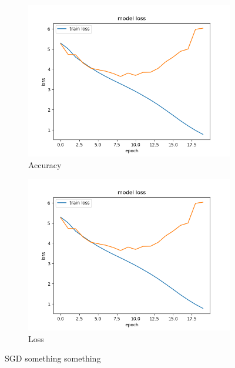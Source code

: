 

\begin{figure}[!h]
\begin{subfigure}{.5\textwidth}
  \centering
  \includegraphics[width=1.1\linewidth]{../../src/loss_plots/sgd.png}
  \caption{Accuracy}
  \label{fig:sfig1}
\end{subfigure}%
\begin{subfigure}{.5\textwidth}
  \centering
  \includegraphics[width=1.1\linewidth]{../../src/loss_plots/sgd.png}
  \caption{Loss}
  \label{fig:sfig2}
\end{subfigure}
\caption{SGD something something}
\label{fig:fig}
\end{figure}
\FloatBarrier
